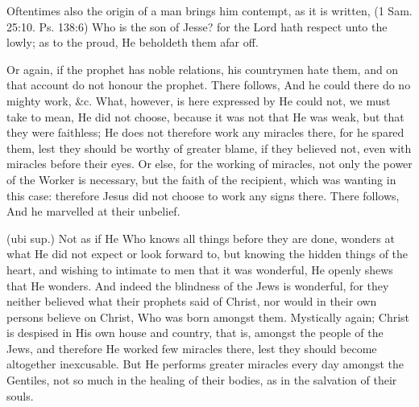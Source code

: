  Oftentimes also the origin of a man brings him contempt, as it is written, (1 Sam. 25:10. Ps. 138:6) Who is the son of Jesse? for the Lord hath respect unto the lowly; as to the proud, He beholdeth them afar off.

 Or again, if the prophet has noble relations, his countrymen hate them, and on that account do not honour the prophet. There follows, And he could there do no mighty work, \&c. What, however, is here expressed by He could not, we must take to mean, He did not choose, because it was not that He was weak, but that they were faithless; He does not therefore work any miracles there, for he spared them, lest they should be worthy of greater blame, if they believed not, even with miracles before their eyes. Or else, for the working of miracles, not only the power of the Worker is necessary, but the faith of the recipient, which was wanting in this case: therefore Jesus did not choose to work any signs there. There follows, And he marvelled at their unbelief.

 (ubi sup.) Not as if He Who knows all things before they are done, wonders at what He did not expect or look forward to, but knowing the hidden things of the heart, and wishing to intimate to men that it was wonderful, He openly shews that He wonders. And indeed the blindness of the Jews is wonderful, for they neither believed what their prophets said of Christ, nor would in their own persons believe on Christ, Who was born amongst them. Mystically again; Christ is despised in His own house and country, that is, amongst the people of the Jews, and therefore He worked few miracles there, lest they should become altogether inexcusable. But He performs greater miracles every day amongst the Gentiles, not so much in the healing of their bodies, as in the salvation of their souls.

 

